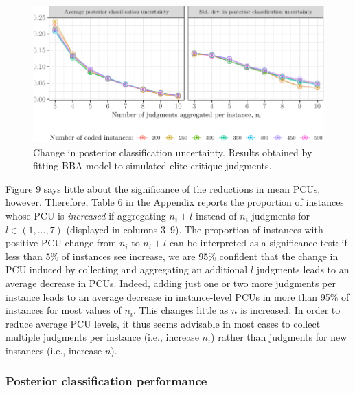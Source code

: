 \documentclass[12pt,]{article}
\begin{document}
\begin{figure}[H]

{\centering \includegraphics{licht_2019_evaluating_crowdsourced_elite_critique_codings_files/figure-latex/plot_pcu_sumstats-1} 

}

\caption{Change in posterior classification uncertainty. Results obtained by fitting BBA model to simulated elite critique judgments.}\label{fig:plot_pcu_sumstats}
\end{figure}

Figure 9 says little about the significance of the reductions in mean
PCUs, however. Therefore, Table 6 in the Appendix reports the proportion
of instances whose PCU is \emph{increased} if aggregating \(n_i + l\)
instead of \(n_i\) judgments for \(l \in (1, \ldots, 7)\) (displayed in
columns 3--9). The proportion of instances with positive PCU change from
\(n_i\) to \(n_i + l\) can be interpreted as a significance test: if
less than 5\% of instances see increase, we are 95\% confident that the
change in PCU induced by collecting and aggregating an additional \(l\)
judgments leads to an average decrease in PCUs. Indeed, adding just one
or two more judgments per instance leads to an average decrease in
instance-level PCUs in more than 95\% of instances for most values of
\(n_i\). This changes little as \(n\) is increased. In order to reduce
average PCU levels, it thus seems advisable in most cases to collect
multiple judgments per instance (i.e., increase \(n_i\)) rather than
judgments for new instances (i.e., increase \(n\)).

\hypertarget{posterior-classification-performance}{%
\subsubsection{Posterior classification
performance}\label{posterior-classification-performance}}
\end{document}
